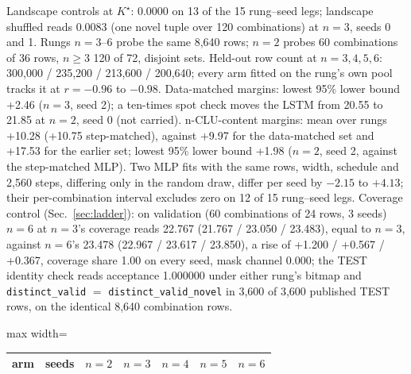 \documentclass{article} %
\newcommand{\Kstar}{\ensuremath{K^{\star}}}
\begin{document}
\begin{table}[t]
{Landscape controls at $\Kstar$: 0.0000 on 13 of the 15 rung--seed legs; landscape shuffled reads 0.0083 %
(one novel tuple over 120 combinations) at $n=3$, seeds 0 and 1. %
Rungs $n=3$--6 probe the same 8,640 rows; $n=2$ probes 60 combinations of 36 rows, $n\ge3$ 120 of 72, disjoint sets. %
Held-out row count at $n=3,4,5,6$: 300,000 / 235,200 / 213,600 / 200,640; every arm fitted on the rung's own %
pool tracks it at $r=-0.96$ to $-0.98$. %
Data-matched margins: lowest 95\% lower bound +2.46 ($n=3$, seed 2); a ten-times spot check moves the LSTM %
from 20.55 to 21.85 at $n=2$, seed 0 (not carried). %
n-CLU-content margins: mean over rungs +10.28 (+10.75 step-matched), against +9.97 for the data-matched set %
and +17.53 for the earlier set; lowest 95\% lower bound +1.98 ($n=2$, seed 2, against the step-matched MLP). %
Two MLP fits with the same rows, width, schedule and 2,560 steps, differing only in the random draw, differ per seed %
by $-2.15$ to $+4.13$; their per-combination interval excludes zero on 12 of 15 rung--seed legs. %
Coverage control (Sec.~\ref{sec:ladder}): on validation (60 combinations of 24 rows, 3 seeds) $n=6$ at $n=3$'s %
coverage reads 22.767 (21.767 / 23.050 / 23.483), equal to $n=3$, against $n=6$'s 23.478 (22.967 / 23.617 / 23.850), %
a rise of +1.200 / +0.567 / +0.367, coverage share 1.00 on every seed, mask channel 0.000; the TEST identity %
check reads acceptance 1.000000 under either rung's bitmap and \texttt{distinct\_valid} $=$ \texttt{distinct\_valid\_novel} %
in 3,600 of 3,600 published TEST rows, on the identical 8,640 combination rows.} %
\label{tab:ladder}
\setlength{\tabcolsep}{2.6pt}
\begin{adjustbox}{max width=\linewidth}\begin{tabular}{lcccccc}
\toprule
arm & seeds & $n=2$ & $n=3$ & $n=4$ & $n=5$ & $n=6$ \\
\midrule

\end{tabular}
\end{adjustbox}
\end{table}
\end{document}

